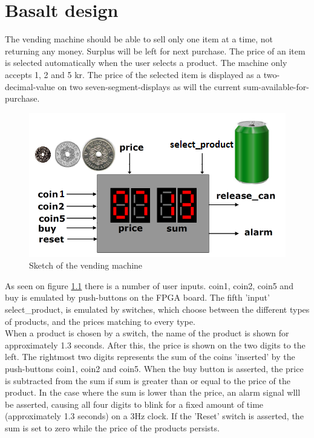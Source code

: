 \chapter{Basalt design}
The vending machine should be able to sell only one item at a time, not returning any money. Surplus will be left for next purchase. The price of an item is selected automatically when the user selects a product. The machine only accepts 1, 2 and 5 kr. The price of the selected item is displayed as a two-decimal-value on two seven-segment-displays as will the current sum-available-for-purchase. 

\begin{figure}[h!]
\centering
\includegraphics[scale=0.8]{figs/vendingdisplay.png}
\caption{Sketch of the vending machine}
\label{fig:vendingdisplay}
\end{figure}

As seen on figure \ref{fig:vendingdisplay} there is a number of user inputs. coin1, coin2, coin5 and buy is emulated by push-buttons on the FPGA board. The fifth 'input' select\_product, is emulated by switches, which choose between the different types of products, and the prices matching to every type. \\

When a product is chosen by a switch, the name of the product is shown for approximately 1.3 seconds. After this, the price is shown on the two digits to the left. The rightmost two digits represents the sum of the coins 'inserted' by the push-buttons coin1, coin2 and coin5. When the buy button is asserted, the price is subtracted from the sum if sum is greater than or equal to the price of the product. In the case where the sum is lower than the price, an alarm signal wlll be asserted, causing all four digits to blink for a fixed amount of time (approximately 1.3 seconds) on a 3Hz clock. If the 'Reset' switch is asserted, the sum is set to zero while the price of the products persists. \\

